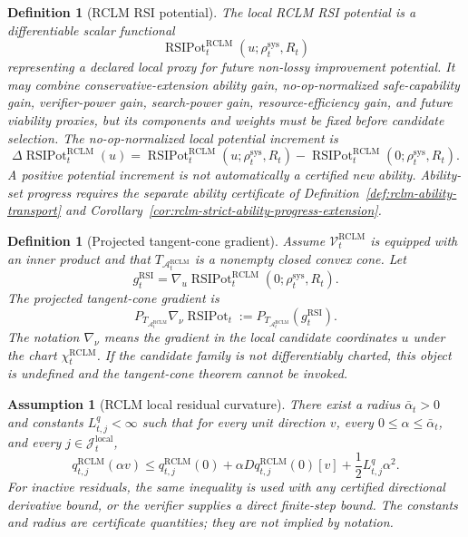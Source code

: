 \documentclass[11pt,a4paper]{article}
\newtheorem{definition}[theorem]{Definition}
\newtheorem{assumption}[theorem]{Assumption}
\newcommand{\Acal}{\mathcal A}
\newcommand{\RCLM}{\mathrm{RCLM}}
\newcommand{\RSI}{\mathrm{RSI}}
\newcommand{\sys}{\mathrm{sys}}
\newcommand{\local}{\mathrm{local}}
\newcommand{\RSIPot}{\operatorname{RSIPot}}
\begin{document}
\begin{definition}[RCLM RSI potential]
\label{def:rclm-rsi-potential}
The local RCLM RSI potential is a differentiable scalar functional
\[
\RSIPot_t^{\RCLM}(u;\rho_t^{\sys},R_t)
\]
representing a declared local proxy for future non-lossy improvement potential.  It may combine conservative-extension ability gain, no-op-normalized safe-capability gain, verifier-power gain, search-power gain, resource-efficiency gain, and future viability proxies, but its components and weights must be fixed before candidate selection.  The no-op-normalized local potential increment is
\[
\Delta\RSIPot_t^{\RCLM}(u)
=
\RSIPot_t^{\RCLM}(u;\rho_t^{\sys},R_t)
-
\RSIPot_t^{\RCLM}(0;\rho_t^{\sys},R_t).
\]
A positive potential increment is not automatically a certified new ability.  Ability-set progress requires the separate ability certificate of Definition~\ref{def:rclm-ability-transport} and Corollary~\ref{cor:rclm-strict-ability-progress-extension}.
\end{definition}

\begin{definition}[Projected tangent-cone gradient]
\label{def:rclm-projected-tangent-cone-gradient}
Assume \(\mathcal V_t^{\RCLM}\) is equipped with an inner product and that \(T_{\Acal_t^{\RCLM}}\) is a nonempty closed convex cone.  Let
\[
g_t^{\RSI}
=
\nabla_u\RSIPot_t^{\RCLM}(0;\rho_t^{\sys},R_t).
\]
The projected tangent-cone gradient is
\[
\boxed{
P_{T_{\Acal_t^{\RCLM}}}
\nabla_\nu \RSIPot_t
:=
P_{T_{\Acal_t^{\RCLM}}}(g_t^{\RSI}).
}
\]
The notation \(\nabla_\nu\) means the gradient in the local candidate coordinates \(u\) under the chart \(\chi_t^{\RCLM}\).  If the candidate family is not differentiably charted, this object is undefined and the tangent-cone theorem cannot be invoked.
\end{definition}

\begin{assumption}[RCLM local residual curvature]
\label{ass:rclm-local-residual-curvature}
There exist a radius \(\bar\alpha_t>0\) and constants \(L_{t,j}^{q}<\infty\) such that for every unit direction \(v\), every \(0\le\alpha\le\bar\alpha_t\), and every \(j\in\mathcal J_t^{\local}\),
\[
q_{t,j}^{\RCLM}(\alpha v)
\le
q_{t,j}^{\RCLM}(0)+\alpha Dq_{t,j}^{\RCLM}(0)[v]
+\frac12 L_{t,j}^{q}\alpha^2.
\]
For inactive residuals, the same inequality is used with any certified directional derivative bound, or the verifier supplies a direct finite-step bound.  The constants and radius are certificate quantities; they are not implied by notation.
\end{assumption}
\end{document}
